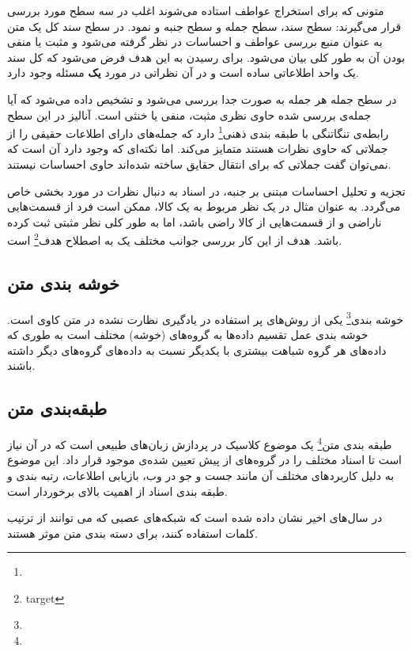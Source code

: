 \documentclass[12pt, a4paper, oneside]{report}
\begin{document}
متونی که برای استخراج عواطف استاده می‌شوند اغلب در سه سطح مورد بررسی قرار می‌گیرند: سطح سند، سطح جمله و سطح جنبه و نمود.
در سطح سند کل یک متن به عنوان منبع بررسی عواطف و احساسات در نظر گرفته می‌شود و مثبت یا منفی بودن آن
به طور کلی بیان می‌شود. برای رسیدن به این هدف فرض می‌شود که کل سند یک واحد اطلاعاتی ساده است و در آن
نظراتی در مورد
\textbf{یک}
مسئله وجود دارد.
\cite{zhang2018deep}

در سطح جمله هر جمله به صورت جدا بررسی می‌شود و تشخیص داده می‌شود که آیا جمله‌ی بررسی شده حاوی نظری مثبت، منفی
یا خنثی است. آنالیز در این سطح رابطه‌ی تنگاتنگی با
طبقه بندی ذهنی\footnote{}
دارد که جمله‌های دارای اطلاعات حقیقی را از جملاتی که حاوی نظرات هستند متمایز می‌کند. اما نکته‌ای که وجود دارد آن است که
نمی‌توان گفت جملاتی که برای انتقال حقایق ساخته شده‌اند حاوی احساسات نیستند.
\cite{zhang2018deep}

تجزیه و تحلیل احساسات مبتنی بر جنبه، در اسناد به دنبال نظرات در مورد بخشی خاص می‌گردد. به عنوان مثال در یک نظر
مربوط به یک کالا، ممکن است فرد از قسمت‌هایی ناراضی و از قسمت‌هایی از کالا راضی باشد، اما به طور کلی نظر مثبتی
ثبت کرده باشد. هدف از این کار بررسی جوانب مختلف یک به اصطلاح
هدف\footnote{target}
است.
\cite{zhang2018deep}

\subsection{خوشه بندی متن}

خوشه بندی\footnote{}
یکی از روش‌های پر استفاده در یادگیری نظارت نشده در متن کاوی است. خوشه بندی عمل تقسیم داده‌ها به گروه‌های
(خوشه)
مختلف است به طوری که داده‌های هر گروه شباهت بیشتری با یکدیگر نسبت به داده‌های گروه‌های دیگر داشته باشند\cite{DBLP:journals/corr/AllahyariPASTGK17a}.


\subsection{طبقه‌بندی متن}

طبقه بندی متن\footnote{}
یک موضوع کلاسیک در پردازش زبان‌های طبیعی است که در آن نیاز است تا اسناد مختلف را در گروه‌های
از پیش تعیین شده‌ی موجود قرار داد\cite{c9d4fbeac7324056bed5d1cb262a7268}.
این موضوع به دلیل کاربرد‌های مختلف آن مانند جست و جو در وب، بازیابی اطلاعات،
رتبه بندی و طبقه بندی اسناد از اهمیت بالای برخوردار است\cite{joulin2016fasttext}.

در سال‌های اخیر نشان داده شده است که شبکه‌های عصبی که می توانند از ترتیب کلمات استفاده کنند،
برای دسته بندی متن موثر هستند\cite{iyyer-etal-2015-deep}.
\end{document}
